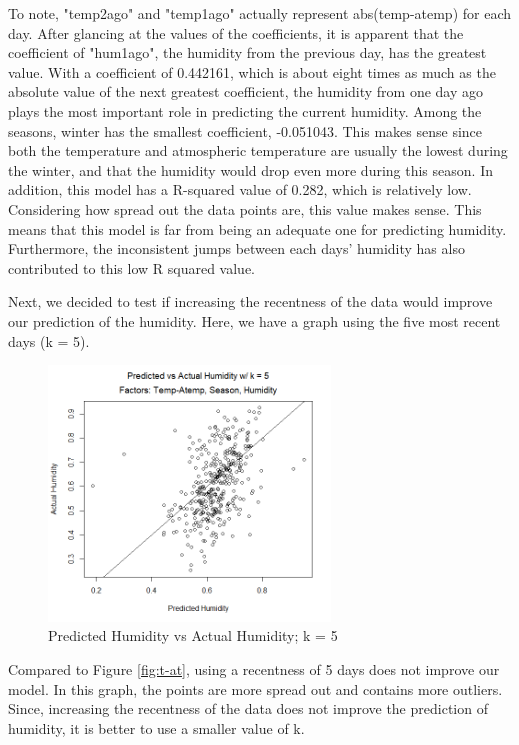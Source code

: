 \documentclass[12pt]{article}
\begin{document}
To note, "temp2ago" and "temp1ago" actually represent abs(temp-atemp) for each day.
After glancing at the values of the coefficients, it is apparent that the coefficient of "hum1ago", the humidity from the previous day, has the greatest value. With a coefficient of 0.442161, which is about eight times as much as the absolute value of the next greatest coefficient, the humidity from one day ago plays the most important role in predicting the current humidity. Among the seasons, winter has the smallest coefficient, -0.051043. This makes sense since both the temperature and atmospheric temperature are usually the lowest during the winter, and that the humidity would drop even more during this season. 
In addition, this model has a R-squared value of 0.282, which is relatively low. Considering how spread out the data points are, this value makes sense. This means that this model is far from being an adequate one for predicting humidity. Furthermore, the inconsistent jumps between each days' humidity has also contributed to this low R squared value.  

Next, we decided to test if increasing the recentness of the data would improve our prediction of the humidity. Here, we have a graph using the five most recent days (k = 5).

\begin{figure} [!h]
	\centering
  	\includegraphics[width=75mm]{T-ATk5.png}
 	\caption{Predicted Humidity vs Actual Humidity; k = 5}
 	\label{fig:t-atk5}
\end{figure} 	

Compared to Figure \ref{fig:t-at}, using a recentness of 5 days does not improve our model. In this graph, the points are more spread out and contains more outliers. Since, increasing the recentness of the data does not improve the prediction of humidity, it is better to use a smaller value of k.
 
\end{document}
